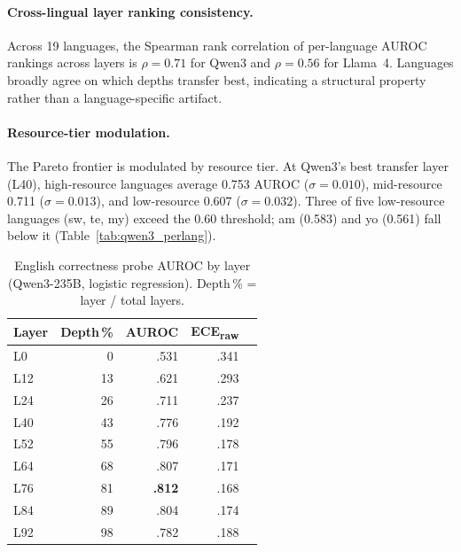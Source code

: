 \documentclass[11pt,a4paper]{article}
\begin{document}
\paragraph{Cross-lingual layer ranking consistency.}
Across 19 languages, the Spearman rank correlation of per-language AUROC rankings across layers is $\rho = 0.71$ for Qwen3 and $\rho = 0.56$ for Llama~4.
Languages broadly agree on which depths transfer best, indicating a structural property rather than a language-specific artifact.

\paragraph{Resource-tier modulation.}
The Pareto frontier is modulated by resource tier.
At Qwen3's best transfer layer (L40), high-resource languages average 0.753 AUROC ($\sigma = 0.010$), mid-resource 0.711 ($\sigma = 0.013$), and low-resource 0.607 ($\sigma = 0.032$).
Three of five low-resource languages (sw, te, my) exceed the 0.60 threshold; am (0.583) and yo (0.561) fall below it (Table~\ref{tab:qwen3_perlang}).

\begin{table}[t]
\centering
\small
\caption{English correctness probe AUROC by layer (Qwen3-235B, logistic regression). Depth\,\% = layer / total layers.}
\label{tab:qwen3_en}
\begin{tabular}{lrrrr}
\toprule
Layer & Depth\,\% & AUROC & ECE\textsubscript{raw} \\
\midrule
L0 & 0 & .531 & .341 \\
L12 & 13 & .621 & .293 \\
L24 & 26 & .711 & .237 \\
L40 & 43 & .776 & .192 \\
L52 & 55 & .796 & .178 \\
L64 & 68 & .807 & .171 \\
L76 & 81 & \textbf{.812} & .168 \\
L84 & 89 & .804 & .174 \\
L92 & 98 & .782 & .188 \\
\bottomrule
\end{tabular}
\end{table}
\end{document}
